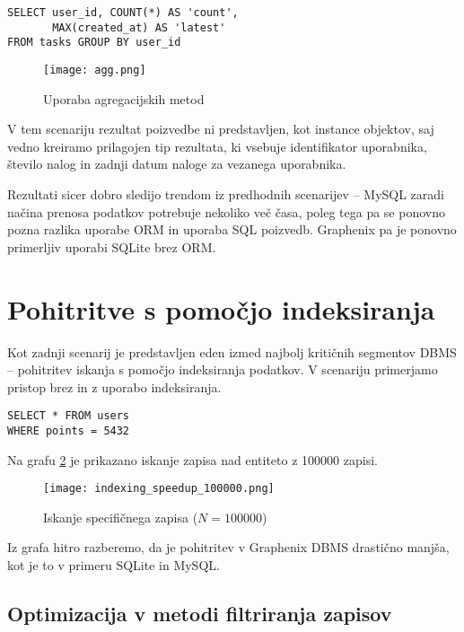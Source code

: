 \documentclass[a4paper,12pt,openright]{book}
\begin{document}
\begin{verbatim}
SELECT user_id, COUNT(*) AS 'count', 
       MAX(created_at) AS 'latest' 
FROM tasks GROUP BY user_id
\end{verbatim}

    \begin{figure}[H]
        \centerline{\texttt{[image: agg.png]}}
        \caption{Uporaba agregacijskih metod}
        \label{agg}
    \end{figure}

    \noindent
    V tem scenariju rezultat poizvedbe ni predstavljen, kot instance objektov, saj vedno kreiramo prilagojen tip rezultata, ki vsebuje identifikator uporabnika, število nalog in zadnji datum naloge za vezanega uporabnika.

    Rezultati sicer dobro sledijo trendom iz predhodnih scenarijev – MySQL zaradi načina prenosa podatkov potrebuje nekoliko več časa, poleg tega pa se ponovno pozna razlika uporabe ORM in uporaba SQL poizvedb. Graphenix pa je ponovno primerljiv uporabi SQLite brez ORM.

    \section{Pohitritve s pomočjo indeksiranja}

    Kot zadnji scenarij je predstavljen eden izmed najbolj kritičnih segmentov DBMS – pohitritev iskanja s pomočjo indeksiranja podatkov. V scenariju primerjamo pristop brez in z uporabo indeksiranja.
    
\begin{verbatim}
SELECT * FROM users
WHERE points = 5432
\end{verbatim}

    \noindent
    Na grafu \ref{old_speedup} je prikazano iskanje zapisa nad entiteto z \num{100000} zapisi.

    \begin{figure}[H]
        \centerline{\texttt{[image: indexing\_speedup\_100000.png]}}
        \caption{Iskanje specifičnega zapisa ($N = \num{100000}$)}
        \label{old_speedup}
    \end{figure}

    \noindent
    Iz grafa hitro razberemo, da je pohitritev v Graphenix DBMS drastično manjša, kot je to v primeru SQLite in MySQL.

    \subsection{Optimizacija v metodi filtriranja zapisov}
\end{document}
